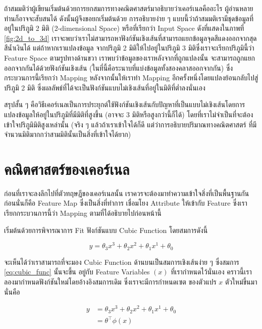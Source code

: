 ถ้าสมมติว่าผู้เขียนเริ่มต้นด้วยการยกสมการทางคณิตศาสตร์มาอธิบายว่าเคอร์เนลคืออะไร ผู้อ่านหลายท่านก็อาจจะสับสนได้ ดังนั้นผู้จึงขอยกเริ่มต้นด้วย%
การอธิบายง่าย ๆ แบบนี้ว่าถ้าสมมติเรามีชุดข้อมูลที่อยู่ในปริภูมิ 2 มิติ (2-dimensional Space) หรือที่เรียกว่า Input Space ดังที่แสดงในภาพที่ 
\ref{fig:2d_to_3d} เราจะพบว่าเราไม่สามารถหาฟังก์ชันเชิงเส้นที่สามารถแยกข้อมูลจุดสีแดงออกจากสุดสีน้ำเงินได้ แต่ถ้าหากเราแปลงข้อมูล%
จากปริภูมิ 2 มิติให้ไปอยู่ในปริภูมิ 3 มิติซึ่งเราจะเรียกปริภูมินี้ว่า Feature Space ตามรูปทางด้านขวา เราพบว่าข้อมูลของเราหลังจากที่ถูกแปลงนั้น%
จะสามารถถูกแยกออกจากกันได้ด้วยฟังก์ชันเชิงเส้น (ในที่นี้คือระนาบที่แบ่งข้อมูลทั้งสองคลาสออกจากกัน) ซึ่งกระบวนการนี้เรียกว่า Mapping 
หลังจากนั้นให้เราทำ Mapping อีกครั้งหนึ่งโดยแปลงย้อนกลับไปสู่ปริภูมิ 2 มิติ ซึ่งผลลัพธ์ที่ได้จะเป็นฟังก์ชันแบบไม่เชิงเส้นที่อยู่ในมิติที่ต่ำลงนั่นเอง 

สรุปสั้น ๆ คือวิธีเคอร์เนลเป็นการประยุกต์ใช้ฟังก์ชันเชิงเส้นกับปัญหาที่เป็นแบบไม่เชิงเส้นโดยการแปลงข้อมูลให้อยู่ในปริภูมิที่มีมิติที่สูงขึ้น (อาจจะ 3 
มิติหรือสูงกว่านี้ก็ได้) โดยที่เราไม่จำเป็นที่จะต้องเข้าใจปริภูมิมิติสูงเหล่านั้น (จริง ๆ แล้วถ้าเราเข้าใจได้ก็ดี แต่ว่าการอธิบายปริมาณทางคณิตศาสตร์%
ที่มีจำนวนมิติมากกว่าสามมิตินั้นเป็นสิ่งที่เข้าใจได้ยาก)

\section{คณิตศาสตร์ของเคอร์เนล}
\label{sec:math_kernel}

ก่อนที่เราจะลงลึกไปที่ตัวทฤษฎีของเคอร์เนลนั้น เราควรจะต้องมาทำความเข้าใจสิ่งที่เป็นพื้นฐานกันก่อนนั่นก็คือ Feature Map ซึ่งเป็นสิ่งที่ทำการ%
เชื่อมโยง Attribute ให้เข้ากับ Feature ซึ่งเราเรียกกระบวนการนี้ว่า Mapping ตามที่ได้อธิบายไปก่อนหน้านี้

เริ่มต้นด้วยการพิจารณาการ Fit ฟังก์ชันแบบ Cubic Function โดยสมการดังนี้

\begin{equation}\label{eq:cubic_func}
    y = \theta_{3}x^{3} + \theta_{2}x^{2} + \theta_{1}x^{1} + \theta_{0}
\end{equation}

\noindent จะเห็นได้ว่าเราสามารถที่จะมอง Cubic Function ด้านบนเป็นสมการเชิงเส้นง่าย ๆ ซึ่งสมการ \ref{eq:cubic_func} นั้นจะขึ้น%
อยู่กับ Feature Variables $(x)$ ที่เรากำหนดไว้นั่นเอง คราวนี้เราลองมากำหนดฟังก์ชันใหม่โดยอ้างอิงสมการเดิม ซึ่งเราจะมีการกำหนดเซต%
ของตัวแปร $x$ ตัวใหม่ขึ้นมานั่นคือ

\begin{align}\label{eq:cubic_func_2}
    y &= \theta_{3}x^{3} + \theta_{2}x^{2} + \theta_{1}x^{1} + \theta_{0} \nonumber \\ 
      &= \theta^{\top}\phi(x)
\end{align}

